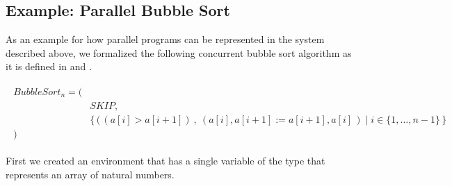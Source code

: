 \subsection{Example: Parallel Bubble Sort}
\label{subsec:parallel-bubble-sort}

As an example for how parallel programs can be represented in the system described above, we formalized the following concurrent bubble sort algorithm as it is defined in \cite{hz-orsi} and \cite{hz-article}.




\vspace{-0.5cm} %

\begin{align}
\begin{split}
    BubbleSort_n = ( & \\
      & SKIP, \\
      & \{ \, ( \, (a[i] > a[i+1])\:,\:(a[i],a[i+1]:= a[i+1],a[i] \, ) \; | \; i \in \{1,\dots,n-1\} \, \} \\
    ) &
\end{split}
\end{align}

First we created an environment that has a single variable of the type that represents an array of natural numbers.


